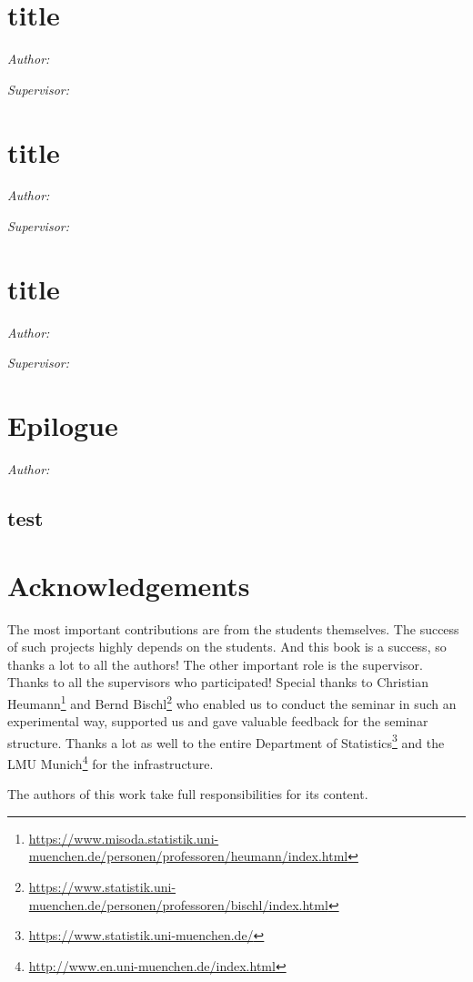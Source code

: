 \documentclass[
]{krantz}
\renewcommand{\href}[2]{#2\footnote{\url{#1}}}
\begin{document}
\hypertarget{title-11}{%
\chapter{title}\label{title-11}}

\emph{Author: }

\emph{Supervisor: }

\hypertarget{title-12}{%
\chapter{title}\label{title-12}}

\emph{Author: }

\emph{Supervisor: }

\hypertarget{title-13}{%
\chapter{title}\label{title-13}}

\emph{Author: }

\emph{Supervisor: }

\hypertarget{epilogue}{%
\chapter{Epilogue}\label{epilogue}}

\emph{Author: }

\hypertarget{test}{%
\section{test}\label{test}}

\hypertarget{acknowledgements}{%
\chapter{Acknowledgements}\label{acknowledgements}}

The most important contributions are from the students themselves.
The success of such projects highly depends on the students.
And this book is a success, so thanks a lot to all the authors!
The other important role is the supervisor.
Thanks to all the supervisors who participated!
Special thanks to \href{https://www.misoda.statistik.uni-muenchen.de/personen/professoren/heumann/index.html}{Christian Heumann} and \href{https://www.statistik.uni-muenchen.de/personen/professoren/bischl/index.html}{Bernd Bischl} who enabled us to conduct the seminar in such an experimental way, supported us and gave valuable feedback for the seminar structure.
Thanks a lot as well to the entire \href{https://www.statistik.uni-muenchen.de/}{Department of Statistics} and the \href{http://www.en.uni-muenchen.de/index.html}{LMU Munich} for the infrastructure.

The authors of this work take full responsibilities for its content.

  

\backmatter
\printindex
\end{document}
